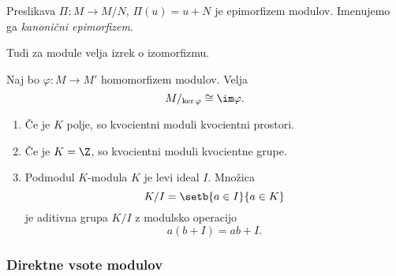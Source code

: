 Preslikava $\Pi \colon M \to M/N$, $\Pi(u) = u + N$ je epimorfizem modulov. Imenujemo ga 
\emph{kanonični epimorfizem}.

Tudi za module velja izrek o izomorfizmu. 
\begin{izrek}[o izomorfizmu]
    Naj bo $\varphi \colon M \to M'$ homomorfizem modulov. Velja
    \[
        M/_{\ker\varphi} \cong \im \varphi.
    \]
\end{izrek}

\begin{primer}
    \begin{enumerate}
        \item Če je $K$ polje, so kvocientni moduli kvocientni prostori.
        \item Če je $K = \Z$, so kvocientni moduli kvocientne grupe.
        \item Podmodul $K$-modula $K$ je levi ideal $I$. Množica 
        \[
            K/I = \setb{a \in I}{a \in K}
        \]
        je aditivna grupa $K/I$ z modulsko operacijo
        \[
            a(b+I) = ab + I.
        \]
    \end{enumerate}
\end{primer}

\subsubsection*{Direktne vsote modulov}

\begin{definicija}
    
\end{definicija}

\begin{primer}
    
\end{primer}

\begin{definicija}
    
\end{definicija}

\begin{trditev}
    
\end{trditev}

\begin{definicija}
    
\end{definicija}

\begin{primer}
    
\end{primer}


